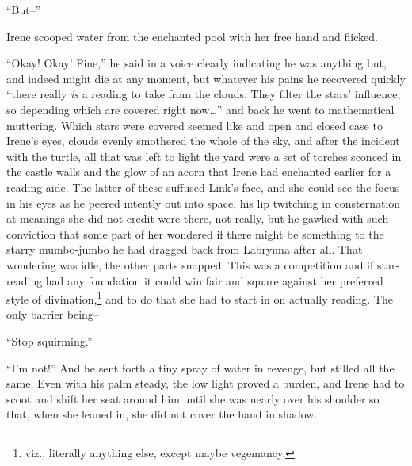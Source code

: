 \documentclass[../FGP.tex]{subfiles}
\begin{document}
``But--'' 

Irene scooped water from the enchanted pool with her free hand and flicked. 

``Okay! Okay! Fine,'' he said in a voice clearly indicating he was anything but, and indeed might die at any moment, but whatever his pains he recovered quickly ``there really \emph{is} a reading to take from the clouds. They filter the stars' influence, so depending which are covered right now\ldots'' and back he went to mathematical muttering. Which stars were covered seemed like and open and closed case to Irene's eyes, clouds evenly smothered the whole of the sky, and after the incident with the turtle, all that was left to light the yard were a set of torches sconced in the castle walls and the glow of an acorn that Irene had enchanted earlier for a reading aide. The latter of these suffused Link's face, and she could see the focus in his eyes as he peered intently out into space, his lip twitching in consternation at meanings she did not credit were there, not really, but he gawked with such conviction that some part of her wondered if there might be something to the starry mumbo-jumbo he had dragged back from Labrynna after all.%
That wondering was idle, the other parts snapped. This was a competition and if star-reading had any foundation it could win fair and square against her preferred style of divination,\footnote{viz., literally anything else, except maybe vegemancy.\footnotemark[2]} and to do that she had to start in on actually reading. The only barrier being--
 
 ``Stop squirming.''

 ``I'm not!'' And he sent forth a tiny spray of water in revenge, but stilled all the same. Even with his palm steady, the low light proved a burden, and Irene had to scoot and shift her seat around him until she was nearly over his shoulder so that, when she leaned in, she did not cover the hand in shadow.
\end{document}
